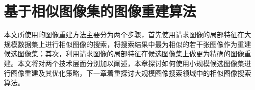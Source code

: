 
\chapter{基于相似图像集的图像重建算法}

本文所使用的图像重建方法主要分为两个步骤，首先使用请求图像的局部特征在大规模数据集上进行相似图像的搜索，将搜索结果中最为相似的若干张图像作为重建候选图像集；其次，利用请求图像的局部特征在候选图像集上做更为精确的图像重建。本文将对两个技术层面分别加以阐述，本章探讨如何使用小规模候选图像集进行图像重建及其优化策略，下一章着重探讨大规模图像搜索领域中的相似图像搜索算法。




